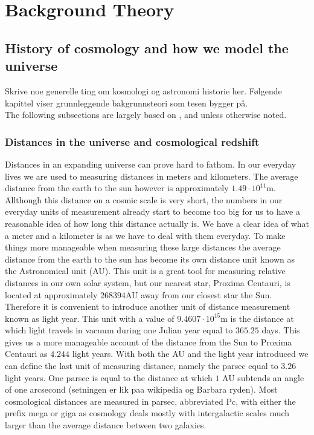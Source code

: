 \chapter{Background Theory}
\section{History of cosmology and how we model the universe}
Skrive noe generelle ting om kosmologi og astronomi historie her.
Følgende kapittel viser grunnleggende bakgrunnsteori som tesen bygger på.\\

The following subsections are largely based on \cite[ch.7]{schneider2006extragalactic}, \cite[ch.2]{Dodelson:1282338} and \cite{ryden2017introduction} unless otherwise noted.
\subsection{Distances in the universe and cosmological redshift}\label{sec:sec_distance}
Distances in an expanding universe can prove hard to fathom. In our everyday
lives we are used to measuring distances in meters and kilometers. The
average distance from the earth to the sun however is approximately $1.49\cdot10^{11}$m.
Allthough this distance on a cosmic scale is very short, the numbers in our
everyday units of measurement already start to become too big for us to have a
reasonable idea of how long this distance actually is. We have a clear idea of
what a meter and a kilometer is as we have to deal with them everyday. To make
things more manageable when measuring these large distances the average distance
from the earth to the sun has become its own distance unit known as the
Astronomical unit (AU). This unit is a great tool for measuring relative
distances in our own solar system, but our nearest star, Proxima Centauri, is
located at approximately $268394$AU away from our closest star the Sun.
Therefore it is convenient to introduce another unit of distance measurement known as light year. This unit with a value of $9.4607\cdot10^{15}$m is the distance at
which light travels in vacuum during one Julian year equal to $365.25$ days.
This gives us a more manageable account of the distance from the Sun to Proxima
Centauri as $4.244$ light years. With both the AU and the light year introduced
we can define the last unit of measuring distance, namely the parsec equal to $3.26$
light years. One parsec is equal to the distance at which $1$ AU subtends an angle
of one arcsecond (setningen er lik paa wikipedia og Barbara ryden). Most
cosmological distances are measured in parsec, abbreviated Pc, with either the
prefix mega or giga as cosmology deals mostly with intergalactic scales much
larger than the average distance between two galaxies.\\

